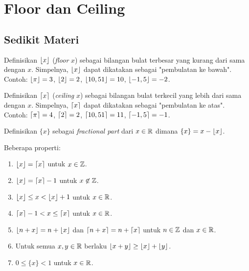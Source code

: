 \documentclass[12pt]{scrartcl}
\begin{document}
\section{Floor dan Ceiling}
\subsection{Sedikit Materi}
Definisikan $\left\lfloor x \right\rfloor$ (\textit{floor} $x$) sebagai bilangan bulat terbesar yang kurang dari sama dengan $x$. Simpelnya, $\left\lfloor x \right\rfloor$ dapat dikatakan sebagai "pembulatan ke bawah". Contoh: $\left\lfloor \pi \right\rfloor=3$, $\left\lfloor 2 \right\rfloor=2$, $\left\lfloor 10,51 \right\rfloor=10$, $\left\lfloor -1,5 \right\rfloor=-2$.

Definisikan $\left\lceil x \right\rceil$ (\textit{ceiling} $x$) sebagai bilangan bulat terkecil yang lebih dari sama dengan $x$. Simpelnya, $\left\lceil x \right\rceil$ dapat dikatakan sebagai "pembulatan ke atas". Contoh: $\left\lceil \pi \right\rceil=4$, $\left\lceil 2 \right\rceil=2$, $\left\lceil 10,51 \right\rceil=11$, $\left\lceil -1,5 \right\rceil=-1$.

Definisikan $\{x\}$ sebagai \textit{fractional part} dari $x \in \mathbb R$ dimana $\{x\} = x - \left\lfloor x \right\rfloor$.

Beberapa properti:
\begin{enumerate}
    \item $\left\lfloor x \right\rfloor=\left\lceil x \right\rceil$ untuk $x \in \mathbb Z$.
    \item $\left\lfloor x \right\rfloor=\left\lceil x \right\rceil-1$ untuk $x \not \in \mathbb Z$.
    \item $\left\lfloor x \right\rfloor \le  x < \left\lfloor x \right\rfloor+1$ untuk $x \in \mathbb R$.
    \item $\left\lceil x \right\rceil-1 < x \le \left\lceil x \right\rceil$ untuk $x \in \mathbb R$.
    \item $\left\lfloor n+x \right\rfloor=n+\left\lfloor x \right\rfloor$ dan $\left\lceil n+x \right\rceil=n+\left\lceil x \right\rceil$ untuk $n\in \mathbb Z$ dan $x \in \mathbb R$.
    \item Untuk semua $x,y \in \mathbb R$ berlaku $\left\lfloor x+y \right\rfloor \ge \left\lfloor x \right\rfloor+\left\lfloor y \right\rfloor$.
    
    \item $0 \le \{x\} < 1$ untuk $x \in \mathbb R$.
\end{enumerate}
\end{document}

